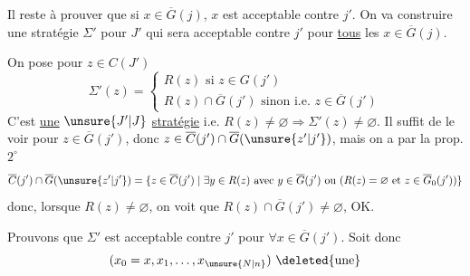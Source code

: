 Il reste à prouver que si $x\in\overline G(j)$,  $x$ est acceptable contre $j'$. On va construire une stratégie $\Sigma'$ pour $J'$ qui sera acceptable  contre $j'$ pour \uline{tous} les $x\in\overline G(j)$.

On pose pour $z\in C(J')$
\[
\Sigma'(z)=\begin{cases}R(z)\text{ si }z\in G(j')\\R(z)\cap\overline G(j')\text{ sinon i.e. }z\in\overline G(j')\end{cases}
\]
C'est \uline{une} $\unsure{J'|J}$ \uline{stratégie} i.e. $R(z)\ne\varnothing\Longrightarrow\Sigma'(z)\ne\varnothing$. Il suffit de le voir pour $z\in\overline G(j')$, donc $z\in\overline C(j')\cap\overline G(\unsure{z'|j'})$, mais on a par la prop. $2^\circ$
\[
\overline C(j')\cap\overline G(\unsure{z'|j'})=\{z\in\overline C(j')\mid\exists y\in R(z)\text{ avec }y\in\overline G(j')\text{ ou }(R(z)=\varnothing\text{ et }z\in\overline G_0(j'))\}
\]
donc, lorsque $R(z)\ne\varnothing$, on voit que $R(z)\cap\overline G(j')\ne\varnothing$, OK.

Prouvons que $\Sigma'$ est acceptable contre $j'$ pour $\forall x\in\overline G(j')$. Soit donc
\[
(x_0=x,x_1,\ldots,x_{\unsure{N|n}})\ \deleted{\text{une}}
\]
